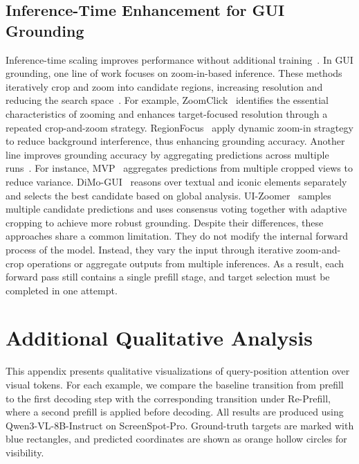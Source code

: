 \documentclass{article}
\begin{document}
\subsection{Inference-Time Enhancement for GUI Grounding}
Inference-time scaling improves performance without additional training~\citep{snell2025scaling}.
In GUI grounding, one line of work focuses on zoom-in-based inference. These methods iteratively crop and zoom into candidate regions, increasing resolution and reducing the search space~\citep{zoomclick, chainofground, regionfocus, guispotlight, nguyen2024improved}. For example, ZoomClick~\citep{zoomclick} identifies the essential characteristics of zooming and enhances target-focused resolution through a repeated crop-and-zoom strategy. RegionFocus~\citep{regionfocus} apply dynamic zoom-in stragtegy to reduce background interference, thus enhancing grounding accuracy.
Another line improves grounding accuracy by aggregating predictions across multiple runs~\citep{mvp, uizoomer, dimogui, guirc, reguide}.
For instance, MVP~\citep{mvp} aggregates predictions from multiple cropped views to reduce variance. DiMo-GUI~\citep{dimogui} reasons over textual and iconic elements separately and selects the best candidate based on global analysis. UI-Zoomer~\citep{uizoomer} samples multiple candidate predictions and uses consensus voting together with adaptive cropping to achieve more robust grounding.
Despite their differences, these approaches share a common limitation. They do not modify the internal forward process of the model. Instead, they vary the input through iterative zoom-and-crop operations or aggregate outputs from multiple inferences.
As a result, each forward pass still contains a single prefill stage, and target selection must be completed in one attempt.


\section{Additional Qualitative Analysis}
\label{app:attn_visualization}
This appendix presents qualitative visualizations of query-position attention over visual tokens. For each example, we compare the baseline transition from prefill to the first decoding step with the corresponding transition under Re-Prefill, where a second prefill is applied before decoding. All results are produced using Qwen3-VL-8B-Instruct on ScreenSpot-Pro. Ground-truth targets are marked with blue rectangles, and predicted coordinates are shown as orange hollow circles for visibility.
\end{document}
